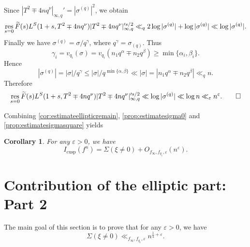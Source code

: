 \documentclass[10pt,oneside,reqno]{amsart}
\makeatletter
\DeclareMathOperator\res{res}
\renewcommand\leq{\leqslant}
\renewcommand\geq{\geqslant}
\theoremstyle{THEOREM}
\newtheorem{corollary}[theorem]{Corollary}
\theoremstyle{DEFINITION}
\theoremstyle{EXERCISE}
\numberwithin{equation}{section}
\renewenvironment{proof}[1][\proofname]{\par
  \vspace{-6pt}
  \pushQED{\qed}
  \normalfont \topsep6\p@\@plus6\p@\relax
  \trivlist
  \item[\hskip\labelsep\rmfamily\bfseries
    #1\@addpunct{:}]\ignorespaces
}{
  \popQED\endtrivlist\@endpefalse
  \vspace{-6pt}
}
\makeatother
\begin{document}
\begin{proof}
Since $|T^2\mp 4nq^\nu|_{\infty,q}'=|{\sigma^{(q)}}|^2$, we obtain
\[
   \res_{s=0}\widetilde{F}(s)L^{S}(1+s,T^2\mp 4nq^\nu)|T^2\mp 4nq^\nu|_{\infty,q}'^{s/2}  \\
  \ll_q 2\log|{\sigma^{(q)}}|+\log|{\sigma^{(q)}}|\ll \log|{\sigma^{(q)}}|.
\]
Finally we have ${\sigma^{(q)}}=\sigma/q^\gamma$, where $q^\gamma=\sigma_{(q)}$. Thus
\[
\gamma_i=v_{q_i}(\sigma)=v_{q_i}(n_1q^\alpha \mp n_2q^\beta)\geq \min\{\alpha_i,\beta_i\}.
\]
Hence 
\[
|{\sigma^{(q)}}|=|\sigma|/q^\gamma\leq |\sigma|/q^{\min\{\alpha,\beta\}}\ll |\sigma|=|n_1q^\alpha \mp n_2q^\beta|\ll_q n.
\]
Therefore
\[
\res_{s=0}\widetilde{F}(s)L^{S}(1+s,T^2\mp 4nq^\nu)|T^2\mp 4nq^\nu|_{\infty,q}'^{s/2}  \\
  \ll  \log|{\sigma^{(q)}}|\ll \log n\ll_{\varepsilon} n^\varepsilon.\qedhere
\]
\end{proof}

Combining \autoref{cor:estimateellipticremain}, \autoref{prop:estimatesigma0} and \autoref{prop:estimatesigmasquare} yields
\begin{corollary}\label{cor:estimateellipticremain2}
For any $\varepsilon>0$, we have
\[
I_{\mathrm{cusp}}(f^n)=\Sigma(\xi\neq 0)+O_{f_\infty,f_{q_i},\varepsilon}(n^\varepsilon).
\]
\end{corollary}

\section{Contribution of the elliptic part: Part 2}\label{sec:elliptic2}
The main goal of this section is to prove that for any $\varepsilon>0$, we have
\[
\Sigma(\xi\neq 0)\ll_{f_{\infty},f_{q_i},\varepsilon} n^{\frac14+\varepsilon}.
\]
\end{document}
